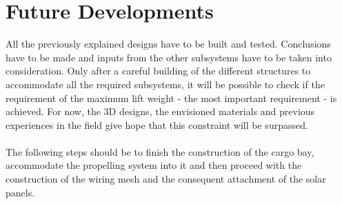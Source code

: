 \section{Future Developments}

All the previously explained designs have to be built and tested. Conclusions have to be made and inputs from the other subsystems have to be taken into consideration. Only after a careful building of the different structures to accommodate all the required subsystems, it will be possible to check if the requirement of the maximum lift weight - the most important requirement - is achieved. For now, the 3D designs, the envisioned materials and previous experiences in the field give hope that this constraint will be surpassed.
\\
\\
The following steps should be to finish the construction of the cargo bay, accommodate the propelling system into it and then proceed with the construction of the wiring mesh and the consequent attachment of the solar panels.
%
%
%
%
%
%
%
%
%
%
%
